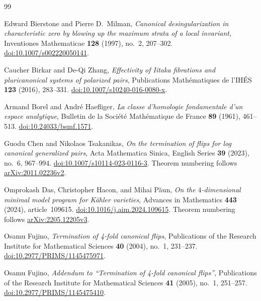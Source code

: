 \begin{thebibliography}{99}
\raggedright

Edward Bierstone and Pierre D.~Milman,
\emph{Canonical desingularization in characteristic zero by blowing up the
maximum strata of a local invariant},
Inventiones Mathematicae \textbf{128} (1997), no.~2, 207--302.
\href{https://doi.org/10.1007/s002220050141}{doi:10.1007/s002220050141}.

Caucher Birkar and De-Qi Zhang,
\emph{Effectivity of Iitaka fibrations and pluricanonical systems of polarized pairs},
Publications Math\'ematiques de l'IH\'ES \textbf{123} (2016), 283--331.
\href{https://doi.org/10.1007/s10240-016-0080-x}{doi:10.1007/s10240-016-0080-x}.

Armand Borel and Andr\'e Haefliger,
\emph{La classe d'homologie fondamentale d'un espace analytique},
Bulletin de la Soci\'et\'e Math\'ematique de France \textbf{89} (1961), 461--513.
\href{https://doi.org/10.24033/bsmf.1571}{doi:10.24033/bsmf.1571}.

Guodu Chen and Nikolaos Tsakanikas,
\emph{On the termination of flips for log canonical generalized pairs},
Acta Mathematica Sinica, English Series \textbf{39} (2023), no.~6, 967--994.
\href{https://doi.org/10.1007/s10114-023-0116-3}{doi:10.1007/s10114-023-0116-3}.
Theorem numbering follows \href{https://arxiv.org/abs/2011.02236v2}{arXiv:2011.02236v2}.

Omprokash Das, Christopher Hacon, and Mihai P\u{a}un,
\emph{On the $4$-dimensional minimal model program for K\"ahler varieties},
Advances in Mathematics \textbf{443} (2024), article~109615.
\href{https://doi.org/10.1016/j.aim.2024.109615}{doi:10.1016/j.aim.2024.109615}.
Theorem numbering follows \href{https://arxiv.org/abs/2205.12205v3}{arXiv:2205.12205v3}.

Osamu Fujino,
\emph{Termination of 4-fold canonical flips},
Publications of the Research Institute for Mathematical Sciences
\textbf{40} (2004), no.~1, 231--237.
\href{https://doi.org/10.2977/PRIMS/1145475971}{doi:10.2977/PRIMS/1145475971}.

Osamu Fujino,
\emph{Addendum to ``Termination of 4-fold canonical flips''},
Publications of the Research Institute for Mathematical Sciences
\textbf{41} (2005), no.~1, 251--257.
\href{https://doi.org/10.2977/PRIMS/1145475410}{doi:10.2977/PRIMS/1145475410}.


\end{thebibliography}
